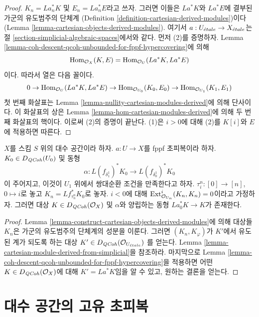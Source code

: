 \begin{proof}
$K_n = La_n^*K$ 및 $E_n = La_n^*E$라고 쓰자. 그러면 이들은
$La^*K$와 $La^*E$에 결부된 가군의 유도범주의 단체계
(Definition \ref{definition-cartesian-derived-modules})이다
(Lemma \ref{lemma-cartesian-objects-derived-modules}).
여기서 $a : U_{\acute{e}tale} \to X_{\acute{e}tale}$는 절
\ref{section-simplicial-algebraic-spaces}에서와 같다.
먼저 (2)를 증명하자. Lemma
\ref{lemma-coh-descent-qcoh-unbounded-for-fppf-hypercovering}에 의해
$$
\mathop{\mathrm{Hom}}\nolimits_{\mathcal{O}_X}(K, E) =
\mathop{\mathrm{Hom}}\nolimits_{\mathcal{O}_U}(La^*K, La^*E)
$$
이다. 따라서 열은 다음 꼴이다.
$$
0
\to
\mathop{\mathrm{Hom}}\nolimits_{\mathcal{O}_U}(La^*K, La^*E)
\to
\mathop{\mathrm{Hom}}\nolimits_{\mathcal{O}_{U_0}}(K_0, E_0)
\to
\mathop{\mathrm{Hom}}\nolimits_{\mathcal{O}_{U_1}}(K_1, E_1)
$$
첫 번째 화살표는 Lemma
\ref{lemma-nullity-cartesian-modules-derived}에 의해 단사이다.
이 화살표의 상은 Lemma
\ref{lemma-hom-cartesian-modules-derived}에 의해 두 번째 화살표의
핵이다. 이로써 (2)의 증명이 끝난다.
(1)은 $i > 0$에 대해 (2)를 $K[i]$와 $E$에 적용하면 따른다.
\end{proof}

\begin{lemma}
\label{lemma-fppf-glue-neg-ext-zero}
$X$를 스킴 $S$ 위의 대수 공간이라 하자.
$a : U \to X$를 fppf 초피복이라 하자.
$K_0 \in D_{\mathit{QCoh}}(U_0)$ 및 동형
$$
\alpha :
L(f_{\delta_1^1})^*K_0
\longrightarrow
L(f_{\delta_0^1})^*K_0
$$
이 주어지고, 이것이
$U_1$ 위에서 쌍대순환 조건을 만족한다고 하자.
$\tau^n_i : [0] \to [n]$, $0 \mapsto i$로 놓고
$K_n = Lf_{\tau^n_n}^*K_0$로 놓자.
$i < 0$에 대해 $\mathop{\mathrm{Ext}}\nolimits^i_{\mathcal{O}_{U_n}}(K_n, K_n) = 0$이라고
가정하자. 그러면 대상 $K \in D_{\mathit{QCoh}}(\mathcal{O}_X)$ 및
$\alpha$와 양립하는 동형
$La_0^*K \to K$가 존재한다.
\end{lemma}

\begin{proof}
Lemma \ref{lemma-construct-cartesian-objects-derived-modules}에 의해
대상들 $K_n$은 가군의 유도범주의 단체계의 성분을 이룬다.
그러면 $(K_n, K_\varphi)$가 $K'$에서 유도된 계가 되도록 하는 대상
$K' \in D_{\mathit{QCoh}}(\mathcal{O}_{U_{\acute{e}tale}})$
를 얻는다. Lemma
\ref{lemma-cartesian-module-derived-from-simplicial}을 참조하라.
마지막으로 Lemma
\ref{lemma-coh-descent-qcoh-unbounded-for-fppf-hypercovering}을 적용하면
어떤 $K \in D_{\mathit{QCoh}}(\mathcal{O}_X)$에 대해
$K' = La^*K$임을 알 수 있고, 원하는 결론을 얻는다.
\end{proof}

\section{대수 공간의 고유 초피복}
\label{section-proper-hypercovering-spaces}

